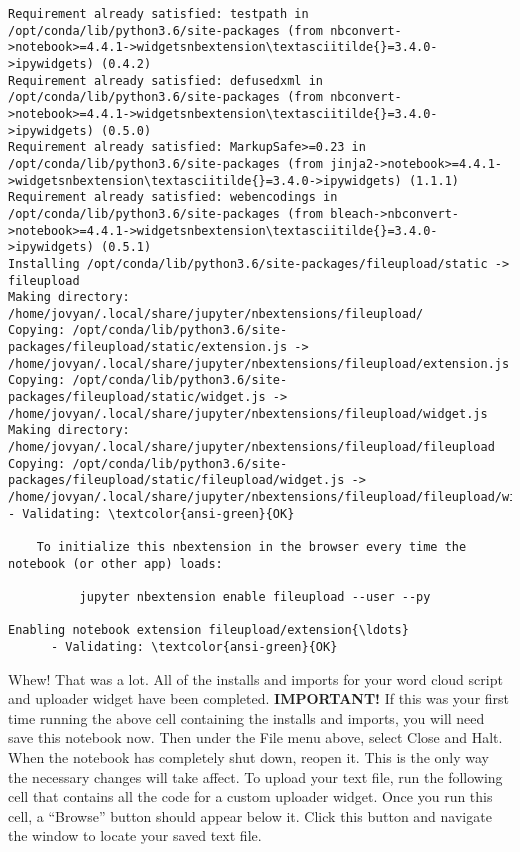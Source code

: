 \documentclass[11pt]{article}
\begin{document}
\begin{Verbatim}[commandchars=\\\{\}]
Requirement already satisfied: testpath in /opt/conda/lib/python3.6/site-packages (from nbconvert->notebook>=4.4.1->widgetsnbextension\textasciitilde{}=3.4.0->ipywidgets) (0.4.2)
Requirement already satisfied: defusedxml in /opt/conda/lib/python3.6/site-packages (from nbconvert->notebook>=4.4.1->widgetsnbextension\textasciitilde{}=3.4.0->ipywidgets) (0.5.0)
Requirement already satisfied: MarkupSafe>=0.23 in /opt/conda/lib/python3.6/site-packages (from jinja2->notebook>=4.4.1->widgetsnbextension\textasciitilde{}=3.4.0->ipywidgets) (1.1.1)
Requirement already satisfied: webencodings in /opt/conda/lib/python3.6/site-packages (from bleach->nbconvert->notebook>=4.4.1->widgetsnbextension\textasciitilde{}=3.4.0->ipywidgets) (0.5.1)
Installing /opt/conda/lib/python3.6/site-packages/fileupload/static -> fileupload
Making directory: /home/jovyan/.local/share/jupyter/nbextensions/fileupload/
Copying: /opt/conda/lib/python3.6/site-packages/fileupload/static/extension.js -> /home/jovyan/.local/share/jupyter/nbextensions/fileupload/extension.js
Copying: /opt/conda/lib/python3.6/site-packages/fileupload/static/widget.js -> /home/jovyan/.local/share/jupyter/nbextensions/fileupload/widget.js
Making directory: /home/jovyan/.local/share/jupyter/nbextensions/fileupload/fileupload
Copying: /opt/conda/lib/python3.6/site-packages/fileupload/static/fileupload/widget.js -> /home/jovyan/.local/share/jupyter/nbextensions/fileupload/fileupload/widget.js
- Validating: \textcolor{ansi-green}{OK}

    To initialize this nbextension in the browser every time the notebook (or other app) loads:
    
          jupyter nbextension enable fileupload --user --py
    
Enabling notebook extension fileupload/extension{\ldots}
      - Validating: \textcolor{ansi-green}{OK}

    \end{Verbatim}

    Whew! That was a lot. All of the installs and imports for your word
cloud script and uploader widget have been completed.
\textbf{IMPORTANT!} If this was your first time running the above cell
containing the installs and imports, you will need save this notebook
now. Then under the File menu above, select Close and Halt. When the
notebook has completely shut down, reopen it. This is the only way the
necessary changes will take affect. To upload your text file, run the
following cell that contains all the code for a custom uploader widget.
Once you run this cell, a ``Browse'' button should appear below it.
Click this button and navigate the window to locate your saved text
file.
\end{document}
